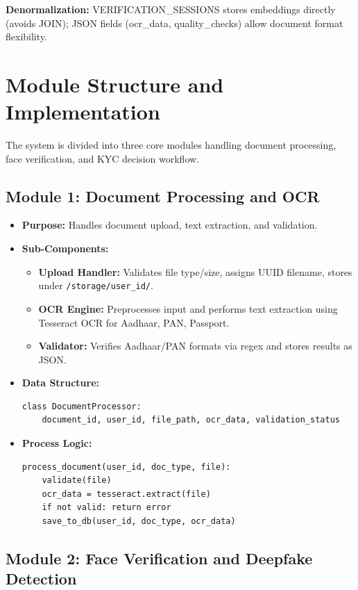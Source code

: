 \documentclass[12pt,a4paper]{article}
\begin{document}
\textbf{Denormalization:} VERIFICATION\_SESSIONS stores embeddings directly (avoids JOIN); JSON fields (ocr\_data, quality\_checks) allow document format flexibility.


\section{Module Structure and Implementation}

The system is divided into three core modules handling document processing, face verification, and KYC decision workflow.

\subsection{Module 1: Document Processing and OCR}

\begin{itemize}
    \item \textbf{Purpose:} Handles document upload, text extraction, and validation.
    \item \textbf{Sub-Components:} 
    \begin{itemize}
        \item \textbf{Upload Handler:} Validates file type/size, assigns UUID filename, stores under \texttt{/storage/user\_id/}.
        \item \textbf{OCR Engine:} Preprocesses input and performs text extraction using Tesseract OCR for Aadhaar, PAN, Passport.
        \item \textbf{Validator:} Verifies Aadhaar/PAN formats via regex and stores results as JSON.
    \end{itemize}
    \item \textbf{Data Structure:}
\begin{verbatim}
class DocumentProcessor:
    document_id, user_id, file_path, ocr_data, validation_status
\end{verbatim}
    \item \textbf{Process Logic:} 
\begin{verbatim}
process_document(user_id, doc_type, file):
    validate(file)
    ocr_data = tesseract.extract(file)
    if not valid: return error
    save_to_db(user_id, doc_type, ocr_data)
\end{verbatim}
\end{itemize}

\subsection{Module 2: Face Verification and Deepfake Detection}
\end{document}
